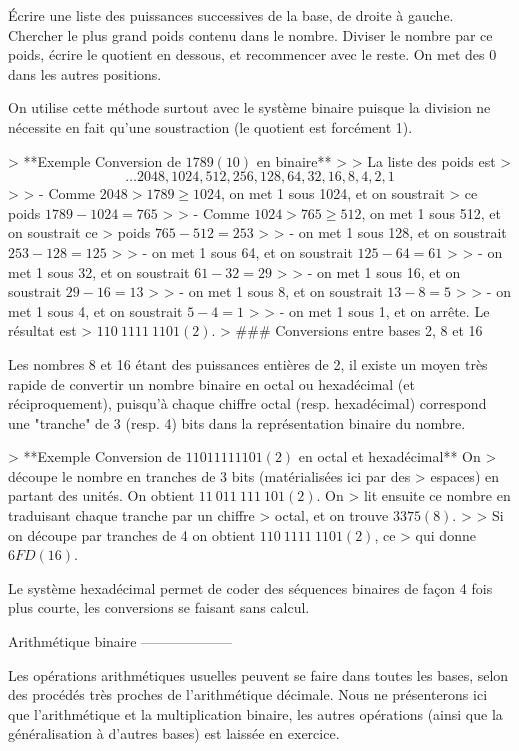 Écrire une liste des puissances successives de la base, de droite à
gauche. Chercher le plus grand poids contenu dans le nombre. Diviser le
nombre par ce poids, écrire le quotient en dessous, et recommencer avec
le reste. On met des 0 dans les autres positions.

On utilise cette méthode surtout avec le système binaire puisque la
division ne nécessite en fait qu'une soustraction (le quotient est
forcément 1).

> **Exemple Conversion de $1789 (10)$ en binaire**
>
> La liste des poids est
> $$\ldots 2048, 1024, 512, 256, 128, 64, 32, 16, 8, 4, 2, 1$$
>
> -   Comme $2048 > 1789 \geq 1024$, on met 1 sous 1024, et on soustrait
>     ce poids $1789 -1024 = 765$
>
> -   Comme $1024 > 765 \geq 512$, on met 1 sous 512, et on soustrait ce
>     poids $765 - 512 = 253$
>
> -   on met 1 sous 128, et on soustrait $253-128 = 125$
>
> -   on met 1 sous 64, et on soustrait $125-64 = 61$
>
> -   on met 1 sous 32, et on soustrait $61-32 = 29$
>
> -   on met 1 sous 16, et on soustrait $29-16 = 13$
>
> -   on met 1 sous 8, et on soustrait $13-8 = 5$
>
> -   on met 1 sous 4, et on soustrait $5-4 = 1$
>
> -   on met 1 sous 1, et on arrête. Le résultat est
>     $110\ 1111\ 1101 (2)$.
>
### Conversions entre bases 2, 8 et 16

Les nombres 8 et 16 étant des puissances entières de 2, il existe un
moyen très rapide de convertir un nombre binaire en octal ou hexadécimal
(et réciproquement), puisqu'à chaque chiffre octal (resp. hexadécimal)
correspond une "tranche" de 3 (resp. 4) bits dans la représentation
binaire du nombre.

> **Exemple Conversion de $11011111101 (2)$ en octal et hexadécimal** On
> découpe le nombre en tranches de 3 bits (matérialisées ici par des
> espaces) en partant des unités. On obtient $11\ 011\ 111\ 101 (2)$. On
> lit ensuite ce nombre en traduisant chaque tranche par un chiffre
> octal, et on trouve $3375 (8)$.
>
> Si on découpe par tranches de 4 on obtient $110\ 1111\ 1101 (2)$, ce
> qui donne $6FD (16)$.

Le système hexadécimal permet de coder des séquences binaires de façon 4
fois plus courte, les conversions se faisant sans calcul.

Arithmétique binaire
--------------------

Les opérations arithmétiques usuelles peuvent se faire dans toutes les
bases, selon des procédés très proches de l'arithmétique décimale. Nous
ne présenterons ici que l'arithmétique et la multiplication binaire, les
autres opérations (ainsi que la généralisation à d'autres bases) est
laissée en exercice.

